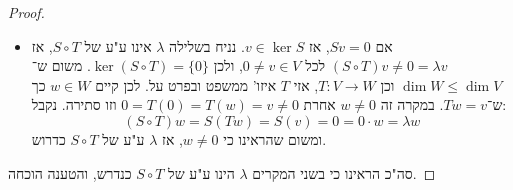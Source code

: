 \documentclass[]{article}
\newcommand\co        {\colon}
\renewcommand\lg      {\lambda}
\theoremstyle{definition}
\begin{document}
\begin{enumerate}
\begin{proof}
\begin{itemize}
				\item אם $Sv = 0$, אז $v \in \ker S$. נניח בשלילה $\lg$ אינו ע"ע של $S \circ T$, אז $(S \circ T)v \neq 0 = \lg v$ לכל $0 \neq v \in V$, ולכן $\ker (S \circ T) = \{0\}$. משום ש־$\dim W \le \dim V$ וכן $T \co V \to W$, אזי $T$ איזו' ממשפט ובפרט על. לכן קיים $w \in W$ כך ש־$Tw = v$. במקרה זה $w \neq 0$ אחרת $0 = T(0) = T(w) = v \neq 0$ וזו סתירה. נקבל: 
				\[ (S \circ T)w = S(Tw) = S(v) = 0 = 0 \cdot w = \lg w \]
				ומשום שהראינו כי $w \neq 0$, אז $\lg$ ע"ע של $S \circ T$ כדרוש. 
			\end{itemize}
			סה"כ הראינו כי בשני המקרים $\lg$ הינו ע"ע של $S \circ T$ כנדרש, והטענה הוכחה. 
		\end{proof}
	\end{enumerate}
	
	
	
\end{document}

